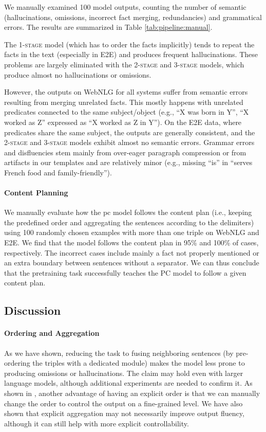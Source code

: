 We manually examined 100 model outputs, counting the number of semantic (hallucinations, omissions, incorrect fact merging, redundancies) and grammatical errors. The results are summarized in Table \ref{tab:pipeline:manual}.

The \textsc{1-stage} model (which has to order the facts implicitly) tends to repeat the facts in the text (especially in E2E) and produces frequent hallucinations. These problems are largely eliminated with the \textsc{2-stage} and \textsc{3-stage} models, which produce almost no hallucinations or omissions.

However, the outputs on WebNLG for all systems suffer from semantic errors resulting from merging unrelated facts. This mostly happens with unrelated predicates connected to the same subject/object (e.g., ``X was born in Y'', ``X worked as Z'' expressed as ``X worked as Z in Y''). On the E2E data, where predicates share the same subject, the outputs are generally consistent, and the \textsc{2-stage} and \textsc{3-stage} models exhibit almost no semantic errors. Grammar errors and disfluencies stem mainly from over-eager paragraph compression or from artifacts in our templates and are relatively minor (e.g., missing ``is'' in ``serves French food and family-friendly'').


\paragraph{Content Planning} We manually evaluate how the \ac{pc} model follows the content plan (i.e., keeping the predefined order and aggregating the sentences according to the delimiters) using 100 randomly chosen examples with more than one triple on WebNLG and E2E. We find that the model follows the content plan in 95\% and 100\% of cases, respectively. The incorrect cases include mainly a fact not properly mentioned or an extra boundary between sentences without a separator. We can thus conclude that the pretraining task successfully teaches the PC model to follow a given content plan.

\subsection{Discussion}
\label{sec:pipeline:discussion}
\paragraph{Ordering and Aggregation} As we have shown, reducing the task to fusing neighboring sentences (by pre-ordering the triples with a dedicated module) makes the model less prone to producing omissions or hallucinations. The claim may hold even with larger language models, although additional experiments are needed to confirm it. As shown in \citet{suPlanthenGenerateControlledDatatoText2021}, another advantage of having an explicit order is that we can manually change the order to control the output on a fine-grained level. We have also shown that explicit aggregation may not necessarily improve output fluency, although it can still help with more explicit controllability.


